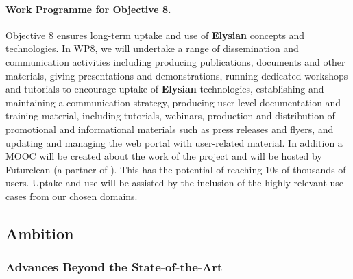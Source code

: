 \documentclass[a4paper,11pt]{article}
\newcommand{\project}[1]{\textbf{#1}\xspace}
\newcommand{\SECURITY}{\project{Elysian}}
\newcommand{\TheProject}{\SECURITY}
\begin{document}
\paragraph{Work Programme for Objective 8.}

Objective 8 ensures long-term uptake and use of \TheProject{} concepts and technologies. In WP8, we will undertake a range of dissemination and communication activities including producing publications, documents and other materials, giving presentations and demonstrations, running dedicated workshops and tutorials to encourage uptake of \TheProject{} technologies, establishing and maintaining a communication strategy, producing user-level documentation and training material, including tutorials, webinars, production and distribution of promotional and informational materials such as press releases and flyers, and updating and managing the web portal with user-related material.  In addition a MOOC will be created about the work of the project and will be hosted by Futurelean (a partner of \UODshort{}). This has the potential of reaching 10s of thousands of users.  Uptake and use will be assisted by the inclusion of the highly-relevant use cases from our chosen domains.


\subsection{Ambition}


\subsubsection{Advances Beyond the State-of-the-Art}
\label{sec:novelty}



\end{document}
